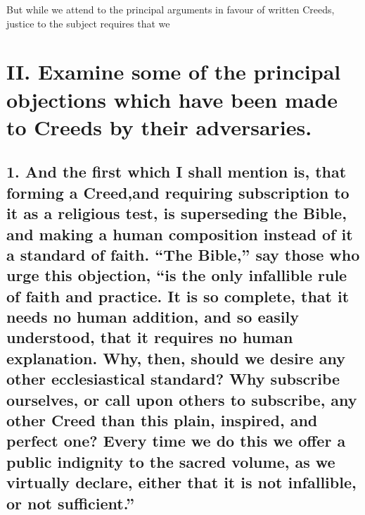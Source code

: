 \documentclass[
]{book}
\begin{document}
But while we attend to the principal arguments in favour of written Creeds, justice to the subject requires that we

\hypertarget{ii.-examine-some-of-the-principal-objections-which-have-been-made-to-creeds-by-their-adversaries.}{%
\section{II. Examine some of the principal objections which have been made to Creeds by their adversaries.}\label{ii.-examine-some-of-the-principal-objections-which-have-been-made-to-creeds-by-their-adversaries.}}

\hypertarget{and-the-first-which-i-shall-mention-is-that-forming-a-creedand-requiring-subscription-to-it-as-a-religious-test-is-superseding-the-bible-and-making-a-human-composition-instead-of-it-a-standard-of-faith.-the-bible-say-those-who-urge-this-objection-is-the-only-infallible-rule-of-faith-and-practice.-it-is-so-complete-that-it-needs-no-human-addition-and-so-easily-understood-that-it-requires-no-human-explanation.-why-then-should-we-desire-any-other-ecclesiastical-standard-why-subscribe-ourselves-or-call-upon-others-to-subscribe-any-other-creed-than-this-plain-inspired-and-perfect-one-every-time-we-do-this-we-offer-a-public-indignity-to-the-sacred-volume-as-we-virtually-declare-either-that-it-is-not-infallible-or-not-sufficient.}{%
\subsection{1. And the first which I shall mention is, that forming a Creed,and requiring subscription to it as a religious test, is superseding the Bible, and making a human composition instead of it a standard of faith. ``The Bible,'' say those who urge this objection, ``is the only infallible rule of faith and practice. It is so complete, that it needs no human addition, and so easily understood, that it requires no human explanation. Why, then, should we desire any other ecclesiastical standard? Why subscribe ourselves, or call upon others to subscribe, any other Creed than this plain, inspired, and perfect one? Every time we do this we offer a public indignity to the sacred volume, as we virtually declare, either that it is not infallible, or not sufficient.''}\label{and-the-first-which-i-shall-mention-is-that-forming-a-creedand-requiring-subscription-to-it-as-a-religious-test-is-superseding-the-bible-and-making-a-human-composition-instead-of-it-a-standard-of-faith.-the-bible-say-those-who-urge-this-objection-is-the-only-infallible-rule-of-faith-and-practice.-it-is-so-complete-that-it-needs-no-human-addition-and-so-easily-understood-that-it-requires-no-human-explanation.-why-then-should-we-desire-any-other-ecclesiastical-standard-why-subscribe-ourselves-or-call-upon-others-to-subscribe-any-other-creed-than-this-plain-inspired-and-perfect-one-every-time-we-do-this-we-offer-a-public-indignity-to-the-sacred-volume-as-we-virtually-declare-either-that-it-is-not-infallible-or-not-sufficient.}}
\end{document}
